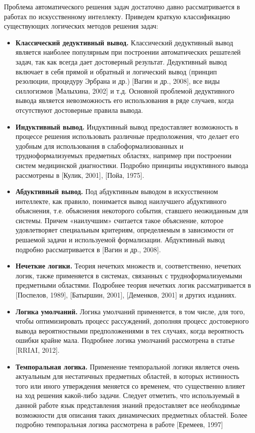 Проблема автоматического решения задач достаточно давно рассматривается в работах по искусственному интеллекту. Приведем краткую классификацию существующих логических методов решения задач:
\begin{itemize}
	\item{\textbf{Классический дедуктивный вывод.} Классический дедуктивный вывод является наиболее популярным при построении автоматических решателей задач, так как всегда дает достоверный результат. Дедуктивный вывод включает в себя прямой и обратный и логический вывод (принцип резолюции, процедуру Эрбрана и др.) [Вагин и др., 2008], все виды силлогизмов [Малыхина, 2002] и т.д. Основной проблемой
	дедуктивного вывода является невозможность его использования в ряде случаев, когда отсутствуют
	достоверные правила вывода.}
	\item{\textbf{Индуктивный вывод.} Индуктивный вывод предоставляет возможность в процессе решения использовать различные предположения, что делает его удобным для использования в слабоформализованных и
	трудноформализуемых предметных областях, например при построении систем медицинской диагностики. Подробно принципы индуктивного вывода рассмотрены в [Кулик, 2001], [Пойа, 1975].}
	\item{\textbf{Абдуктивный вывод.} Под абдуктивным выводом в искусственном интеллекте, как правило, понимается вывод наилучшего абдуктивного объяснения, т.е. объяснения некоторого события, ставшего
	неожиданным для системы. Причем «наилучшим»	считается такое объяснение, которое удовлетворяет специальным критериям, определяемым в зависимости от решаемой задачи и используемой	формализации. Абдуктивный вывод подробно рассматривается в [Вагин и др., 2008].}
	\item{\textbf{Нечеткие логики.} Теория нечетких множеств и, соответственно, нечетких логик, также применяется в системах, связанных с трудноформализуемыми предметными областями. Подробнее теория нечетких логик рассматривается в [Поспелов, 1989], [Батыршин, 2001], [Деменков, 2001] и других изданиях.}
	\item{\textbf{Логика умолчаний.} Логика умолчаний применяется, в том числе, для того, чтобы оптимизировать процесс рассуждений,	дополняя процесс достоверного вывода вероятностными  предположениями в тех случаях, когда вероятность ошибки крайне мала. Подробнее логика умолчаний рассмотрена в статье [RRIAI, 2012].}
	\item{\textbf{Темпоральная логика.} Применение темпоральной логики является очень актуальным для нестатичных предметных областей, в которых истинность того или иного утверждения меняется со временем, что существенно влияет на ход решения какой-либо задачи. Следует отметить, что используемый в 		данной работе язык представления знаний предоставляет все необходимые возможности для описания таких динамических предметных областей. Более подробно темпоральная логика рассмотрена в работе [Еремеев, 1997]}
\end{itemize}

